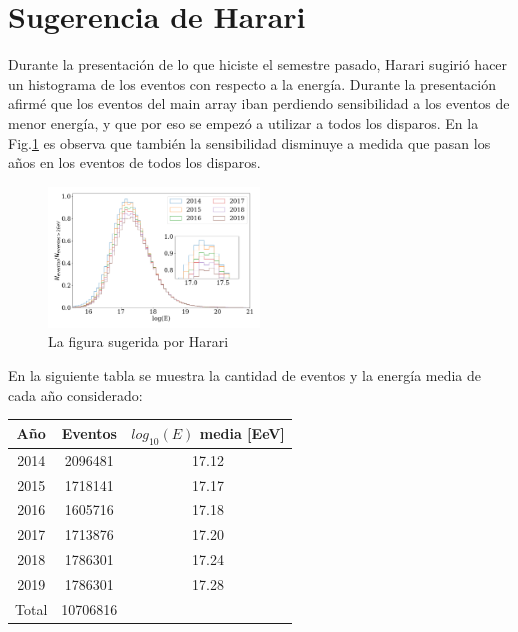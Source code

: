 
	
	

\section{Sugerencia de Harari}

Durante la presentación de lo que hiciste el semestre pasado, Harari sugirió hacer un histograma de los eventos con respecto a la energía. Durante la presentación afirmé que los eventos del main array iban perdiendo sensibilidad a los eventos de menor energía, y que por eso se empezó a utilizar a todos los disparos. En la Fig.\ref{fig:harari} es observa que también la sensibilidad disminuye a medida  que pasan los años en los eventos de todos los disparos. 

\begin{figure}[H]
	\centering
	\includegraphics[width=0.5\textwidth]{figura_harari.png}
	\caption{La figura  sugerida por Harari}
	\label{fig:harari}
\end{figure}

En la siguiente tabla se muestra la cantidad de eventos y la energía media de cada año considerado:

\begin{table}[H]
\centering
\begin{tabular}{c||c|c}
Año & Eventos & ${log_{10}(E)}$ media [EeV]\\ \hline
2014& 2096481 & 17.12\\ \hline
2015& 1718141 & 17.17\\ \hline
2016& 1605716 & 17.18\\ \hline
2017& 1713876 & 17.20\\ \hline
2018& 1786301 & 17.24\\ \hline
2019& 1786301 & 17.28\\ \hline \hline
Total & 10706816 & 
\end{tabular}

\end{table}
